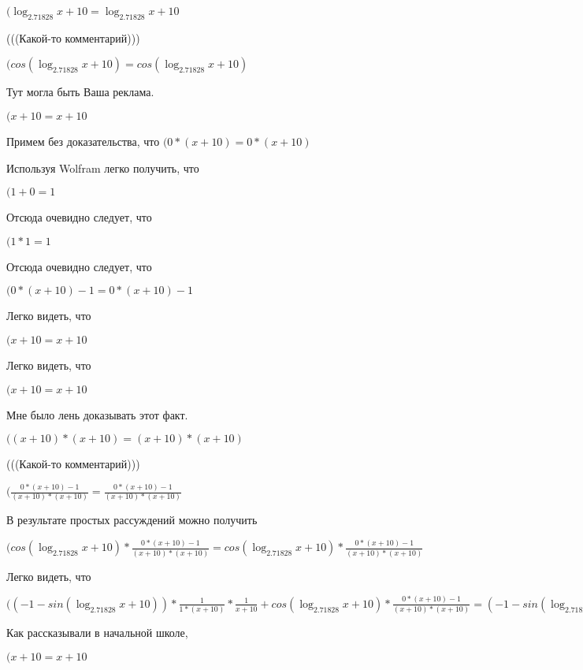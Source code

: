 \documentclass[12pt,a4paper,fleqn]{article}
\theoremstyle{definition}
\begin{document}
$(\log_{ 2.71828 }{ x  +  10 } = \log_{ 2.71828 }{ x  +  10 }$

(((Какой-то комментарий)))

$(cos(\log_{ 2.71828 }{ x  +  10 }) = cos(\log_{ 2.71828 }{ x  +  10 })$

Тут могла быть Ваша реклама.

$( x  +  10  =  x  +  10 $

Примем без доказательства, что
$( 0  * ( x  +  10 ) =  0  * ( x  +  10 )$

Используя Wolfram легко получить, что

$( 1  +  0  =  1 $

Отсюда очевидно следует, что

$( 1  *  1  =  1 $

Отсюда очевидно следует, что

$( 0  * ( x  +  10 ) -  1  =  0  * ( x  +  10 ) -  1 $

Легко видеть, что

$( x  +  10  =  x  +  10 $

Легко видеть, что

$( x  +  10  =  x  +  10 $

Мне было лень доказывать этот факт.

$(( x  +  10 ) * ( x  +  10 ) = ( x  +  10 ) * ( x  +  10 )$

(((Какой-то комментарий)))

$(\frac{ 0  * ( x  +  10 ) -  1 }{( x  +  10 ) * ( x  +  10 )}
 = \frac{ 0  * ( x  +  10 ) -  1 }{( x  +  10 ) * ( x  +  10 )}
$

В результате простых рассуждений можно получить

$(cos(\log_{ 2.71828 }{ x  +  10 }) * \frac{ 0  * ( x  +  10 ) -  1 }{( x  +  10 ) * ( x  +  10 )}
 = cos(\log_{ 2.71828 }{ x  +  10 }) * \frac{ 0  * ( x  +  10 ) -  1 }{( x  +  10 ) * ( x  +  10 )}
$

Легко видеть, что

$(( -1  - sin(\log_{ 2.71828 }{ x  +  10 })) * \frac{ 1 }{ 1  * ( x  +  10 )}
 * \frac{ 1 }{ x  +  10 }
 + cos(\log_{ 2.71828 }{ x  +  10 }) * \frac{ 0  * ( x  +  10 ) -  1 }{( x  +  10 ) * ( x  +  10 )}
 = ( -1  - sin(\log_{ 2.71828 }{ x  +  10 })) * \frac{ 1 }{ 1  * ( x  +  10 )}
 * \frac{ 1 }{ x  +  10 }
 + cos(\log_{ 2.71828 }{ x  +  10 }) * \frac{ 0  * ( x  +  10 ) -  1 }{( x  +  10 ) * ( x  +  10 )}
$

Как рассказывали в начальной школе,

$( x  +  10  =  x  +  10 $
\end{document}
